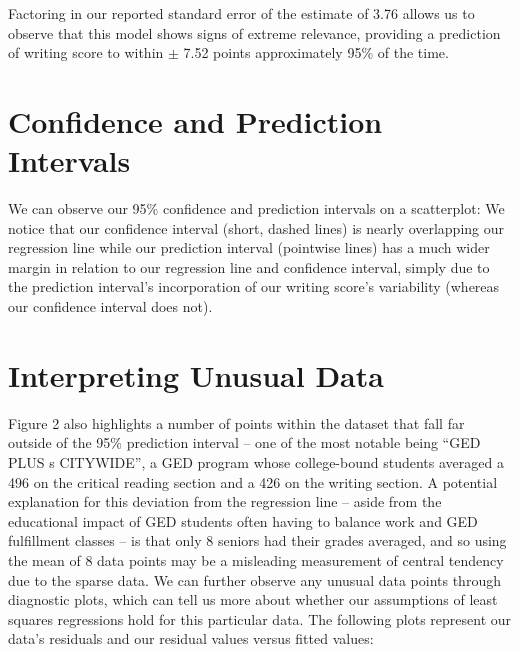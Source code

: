 \documentclass[11pt]{article} %
\begin{document}
Factoring in our reported standard error of the estimate of 3.76 allows us to observe that this model shows signs of extreme relevance, providing a prediction of writing score to within $\pm$ 7.52 points approximately 95\% of the time. 

\section*{Confidence and Prediction Intervals}
We can observe our 95\% confidence and prediction intervals on a scatterplot:
We notice that our confidence interval (short, dashed lines) is nearly overlapping our regression line while our prediction interval (pointwise lines) has a much wider margin in relation to our regression line and confidence interval, simply due to the prediction interval's incorporation of our writing score's variability (whereas our confidence interval does not).


\section*{Interpreting Unusual Data}
Figure 2 also highlights a number of points within the dataset that fall far outside of the 95\% prediction interval -- one of the most notable being ``GED PLUS s CITYWIDE'', a GED program whose college-bound students averaged a 496 on the critical reading section and a 426 on the writing section. A potential explanation for this deviation from the regression line -- aside from the educational impact of GED students often having to balance work and GED fulfillment classes -- is that only 8 seniors had their grades averaged, and so using the mean of 8 data points may be a misleading measurement of central tendency due to the sparse data. We can further observe any unusual data points through diagnostic plots, which can tell us more about whether our assumptions of least squares regressions hold for this particular data. The following plots represent our data's residuals and our residual values versus fitted values:

\end{document}
